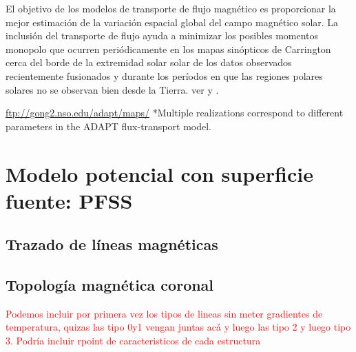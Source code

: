 El objetivo de los modelos de transporte de flujo magnético es proporcionar la mejor estimación de la variación espacial global del campo magnético solar. La inclusión del transporte de flujo ayuda a minimizar los posibles momentos monopolo que ocurren periódicamente en los mapas sinópticos de Carrington cerca del borde de la extremidad solar solar de los datos observados recientemente fusionados y durante los períodos en que las regiones polares solares no se observan bien desde la Tierra. ver \citep{arge_2010} y \citep{hickmann_2015}.


\url{ftp://gong2.nso.edu/adapt/maps/}
*Multiple realizations correspond to different parameters in the ADAPT flux-transport model.

\section{Modelo potencial con superficie fuente: PFSS}
\subsection{Trazado de líneas magnéticas}
\subsection{Topología magnética coronal}
\textcolor{red}{Podemos incluir por primera vez los tipos de lineas sin meter gradientes de temperatura, quizas las tipo 0y1 vengan juntas acá y luego las tipo 2 y luego tipo 3. Podría incluir rpoint de caracteristicos de cada estructura} 
